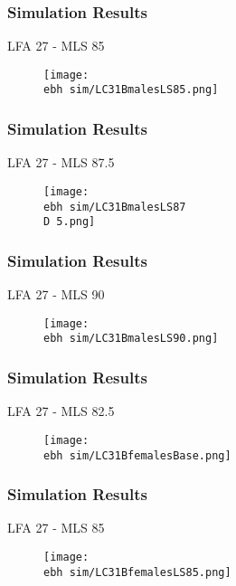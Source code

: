 \documentclass{beamer}
\newcommand{\ebh}{\string~/bio.data/bio.lobster/figures/LFA2733Framework2018/} %
\newcommand{\D}{.}
\begin{document}
\begin{frame}
\frametitle{Simulation Results}
LFA 27 - MLS 85
\begin{figure}
        \begin{center}
            \texttt{[image: \\ebh sim/LC31BmalesLS85.png]}
        \end{center}
    \end{figure}
\end{frame}


\begin{frame}
\frametitle{Simulation Results}
LFA 27 - MLS 87.5
\begin{figure}
        \begin{center}
            \texttt{[image: \\ebh sim/LC31BmalesLS87\\D 5.png]}
        \end{center}
    \end{figure}
\end{frame}


\begin{frame}
\frametitle{Simulation Results}
LFA 27 - MLS 90
\begin{figure}
        \begin{center}
            \texttt{[image: \\ebh sim/LC31BmalesLS90.png]}
        \end{center}
    \end{figure}
\end{frame}




\begin{frame}
\frametitle{Simulation Results}
LFA 27 - MLS 82.5
\begin{figure}
        \begin{center}
            \texttt{[image: \\ebh sim/LC31BfemalesBase.png]}
        \end{center}
    \end{figure}
\end{frame}



\begin{frame}
\frametitle{Simulation Results}
LFA 27 - MLS 85
\begin{figure}
        \begin{center}
            \texttt{[image: \\ebh sim/LC31BfemalesLS85.png]}
        \end{center}
    \end{figure}
\end{frame}
\end{document}
